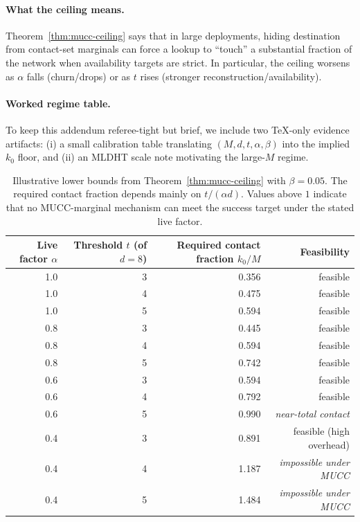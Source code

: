 \documentclass[11pt]{article}
\begin{document}
\paragraph{What the ceiling means.}
Theorem~\ref{thm:mucc-ceiling} says that in large deployments, hiding destination from contact-set marginals can force a lookup to ``touch'' a substantial fraction of the network when availability targets are strict.
In particular, the ceiling worsens as $\alpha$ falls (churn/drops) or as $t$ rises (stronger reconstruction/availability).

\paragraph{Worked regime table.}
To keep this addendum referee-tight but brief, we include two TeX-only evidence artifacts:
(i) a small calibration table translating $(M,d,t,\alpha,\beta)$ into the implied $k_0$ floor,
and (ii) an MLDHT scale note motivating the large-$M$ regime.

\begin{table}[h]
\centering
\begin{tabular}{@{}rrrr@{}}
\toprule
Live factor $\alpha$ & Threshold $t$ (of $d=8$) & Required contact fraction $k_0/M$ & Feasibility \\
\midrule
1.0 & 3 & 0.356 & feasible \\
1.0 & 4 & 0.475 & feasible \\
1.0 & 5 & 0.594 & feasible \\
0.8 & 3 & 0.445 & feasible \\
0.8 & 4 & 0.594 & feasible \\
0.8 & 5 & 0.742 & feasible \\
0.6 & 3 & 0.594 & feasible \\
0.6 & 4 & 0.792 & feasible \\
0.6 & 5 & 0.990 & \emph{near-total contact} \\
0.4 & 3 & 0.891 & feasible (high overhead) \\
0.4 & 4 & 1.187 & \emph{impossible under MUCC} \\
0.4 & 5 & 1.484 & \emph{impossible under MUCC} \\
\bottomrule
\end{tabular}
\caption{Illustrative lower bounds from Theorem~\ref{thm:mucc-ceiling} with $\beta=0.05$.
The required contact fraction depends mainly on $t/(\alpha d)$.
Values above $1$ indicate that no MUCC-marginal mechanism can meet the success target under the stated live factor.
}
\label{tab:mucc-numbers}
\end{table}
\end{document}
